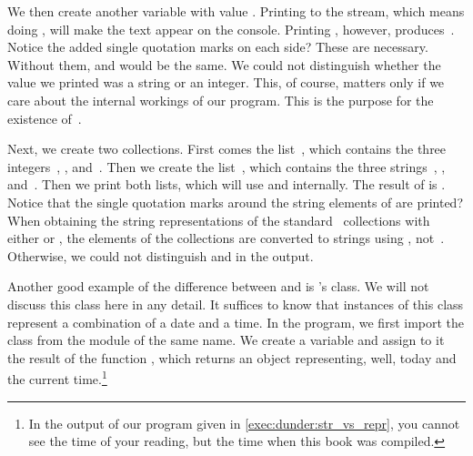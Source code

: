 We then create another variable  with value .
Printing  to the  stream, which means doing , will make the text  appear on the console.
Printing , however, produces~.
Notice the added single quotation marks on each side?
These are necessary.
Without them,  and  would be the same.
We could not distinguish whether the value we printed was a string or an integer.
This, of course, matters only if we care about the internal workings of our program.
This is the purpose for the existence of~.%
%
\begin{sloppypar}%
Next, we create two collections.
First comes the list~, which contains the three integers~, , and~.
Then we create the list~, which contains the three strings~, , and~.
Then we print both lists, which will use  and  internally.
The result of  is .
Notice that the single quotation marks around the string elements of  are printed?
When obtaining the string representations of the standard \python\ collections with either  or , the elements of the collections are converted to strings using , not~.
Otherwise, we could not distinguish  and  in the output.%
\end{sloppypar}%
%
Another good example of the difference between  and  is \python's  class.
We will not discuss this class here in any detail.
It suffices to know that instances of this class represent a combination of a date and a time.
In the program, we first import the class  from the module of the same name.
We create a variable  and assign to it the result of the function , which returns an object representing, well, today and the current time.\footnote{%
In the output of our program given in \cref{exec:dunder:str_vs_repr}, you cannot see the time of your reading, but the time when this book was compiled.}

